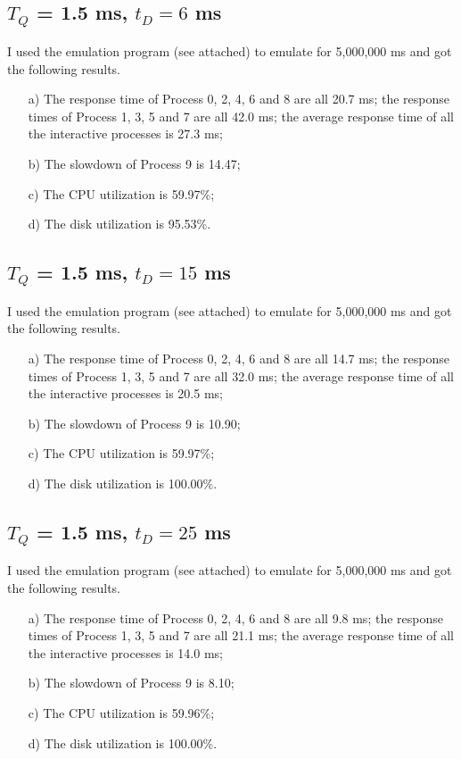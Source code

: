\documentclass[12pt,letterpaper]{article}
\begin{document}
\subsection{$T_Q$ = 1.5 ms, $t_D=6$ ms}
I used the emulation program (see attached) to emulate for 5,000,000 ms and got the following results.
\begin{enumerate}
\item[a)] The response time of Process 0, 2, 4, 6 and 8 are all 20.7 ms; the response times of Process 1, 3, 5 and 7 are all 42.0 ms; the average response time of all the interactive processes is 27.3 ms;
\item[b)] The slowdown of Process 9 is 14.47;
\item[c)] The CPU utilization is 59.97\%;
\item[d)] The disk utilization is 95.53\%.
\end{enumerate}

\subsection{$T_Q$ = 1.5 ms, $t_D=15$ ms}
I used the emulation program (see attached) to emulate for 5,000,000 ms and got the following results.
\begin{enumerate}
\item[a)] The response time of Process 0, 2, 4, 6 and 8 are all 14.7 ms; the response times of Process 1, 3, 5 and 7 are all 32.0 ms; the average response time of all the interactive processes is 20.5 ms;
\item[b)] The slowdown of Process 9 is 10.90;
\item[c)] The CPU utilization is 59.97\%;
\item[d)] The disk utilization is 100.00\%.
\end{enumerate}

\subsection{$T_Q$ = 1.5 ms, $t_D=25$ ms}
I used the emulation program (see attached) to emulate for 5,000,000 ms and got the following results.
\begin{enumerate}
\item[a)] The response time of Process 0, 2, 4, 6 and 8 are all 9.8 ms; the response times of Process 1, 3, 5 and 7 are all 21.1 ms; the average response time of all the interactive processes is 14.0 ms;
\item[b)] The slowdown of Process 9 is 8.10;
\item[c)] The CPU utilization is 59.96\%;
\item[d)] The disk utilization is 100.00\%.
\end{enumerate}
\end{document}
